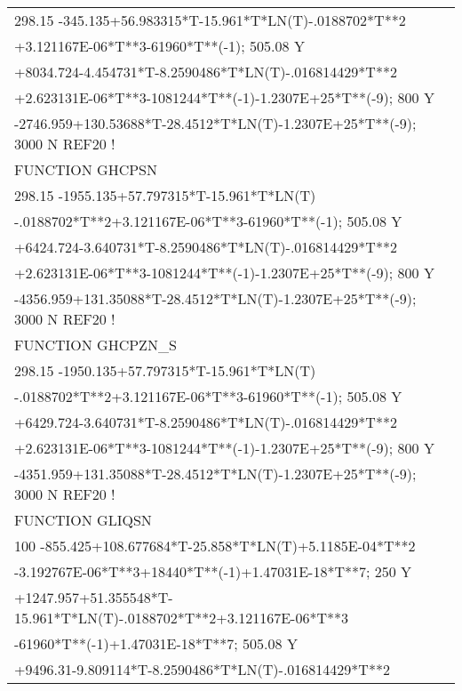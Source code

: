 \begin{longtable}[H]{ l l l }
	\multicolumn{3}{l}{298.15 -345.135+56.983315*T-15.961*T*LN(T)-.0188702*T**2}\\
	\multicolumn{3}{l}{+3.121167E-06*T**3-61960*T**(-1); 505.08 Y}\\
	\multicolumn{3}{l}{+8034.724-4.454731*T-8.2590486*T*LN(T)-.016814429*T**2}\\
	\multicolumn{3}{l}{+2.623131E-06*T**3-1081244*T**(-1)-1.2307E+25*T**(-9); 800 Y}\\
	\multicolumn{3}{l}{-2746.959+130.53688*T-28.4512*T*LN(T)-1.2307E+25*T**(-9); 3000 N REF20 !}\\
	FUNCTION GHCPSN & & \\
	\multicolumn{3}{l}{298.15 -1955.135+57.797315*T-15.961*T*LN(T)}\\
	\multicolumn{3}{l}{-.0188702*T**2+3.121167E-06*T**3-61960*T**(-1); 505.08 Y}\\
	\multicolumn{3}{l}{+6424.724-3.640731*T-8.2590486*T*LN(T)-.016814429*T**2
}\\
	\multicolumn{3}{l}{+2.623131E-06*T**3-1081244*T**(-1)-1.2307E+25*T**(-9); 800 Y}\\
	\multicolumn{3}{l}{-4356.959+131.35088*T-28.4512*T*LN(T)-1.2307E+25*T**(-9); 3000 N REF20 !}\\
	FUNCTION GHCPZN\_S & & \\
	\multicolumn{3}{l}{298.15 -1950.135+57.797315*T-15.961*T*LN(T)}\\
	\multicolumn{3}{l}{-.0188702*T**2+3.121167E-06*T**3-61960*T**(-1); 505.08 Y}\\
	\multicolumn{3}{l}{+6429.724-3.640731*T-8.2590486*T*LN(T)-.016814429*T**2}\\
	\multicolumn{3}{l}{+2.623131E-06*T**3-1081244*T**(-1)-1.2307E+25*T**(-9); 800 Y}\\
	\multicolumn{3}{l}{-4351.959+131.35088*T-28.4512*T*LN(T)-1.2307E+25*T**(-9); 3000 N REF20 !}\\
	FUNCTION GLIQSN & & \\
	\multicolumn{3}{l}{100 -855.425+108.677684*T-25.858*T*LN(T)+5.1185E-04*T**2}\\
	\multicolumn{3}{l}{-3.192767E-06*T**3+18440*T**(-1)+1.47031E-18*T**7; 250 Y}\\
	\multicolumn{3}{l}{+1247.957+51.355548*T-15.961*T*LN(T)-.0188702*T**2+3.121167E-06*T**3}\\
	\multicolumn{3}{l}{-61960*T**(-1)+1.47031E-18*T**7; 505.08 Y}\\
	\multicolumn{3}{l}{+9496.31-9.809114*T-8.2590486*T*LN(T)-.016814429*T**2}\\

\end{longtable}
